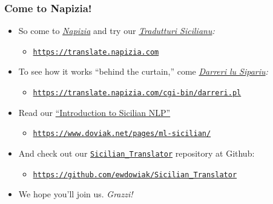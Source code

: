 \documentclass{beamer}
\begin{document}

\begin{frame}
  \frametitle{Come to Napizia!}
  \vspace{-1.0em}
  \begin{itemize}
  \item So come to \href{https://www.napizia.com/index.shtml}{\textit{Napizia}} and try our
    \href{https://translate.napizia.com}{\textit{Tradutturi Sicilianu}}\textit{:}
    \begin{itemize}
    \item \footnotesize{\href{https://translate.napizia.com}{\texttt{https://translate.napizia.com}}}
    \end{itemize}
    \vspace{0.65em}
  \item To see how it works ``behind the curtain,'' come
    \href{https://translate.napizia.com/cgi-bin/darreri.pl}{\textit{Darreri lu Sipariu}}\textit{:}
    \begin{itemize}
    \item \footnotesize{\href{https://translate.napizia.com/cgi-bin/darreri.pl}{\texttt{https://translate.napizia.com/cgi-bin/darreri.pl}}}
    \end{itemize}
    \vspace{0.65em}
  \item Read our \href{https://www.doviak.net/pages/ml-sicilian/}{``Introduction to Sicilian NLP''}
    \begin{itemize}
    \item \footnotesize{\href{https://www.doviak.net/pages/ml-sicilian/}{\texttt{https://www.doviak.net/pages/ml-sicilian/}}}
    \end{itemize}
    \vspace{0.65em}
  \item And check out our \href{https://github.com/ewdowiak/Sicilian_Translator}{\texttt{Sicilian\_Translator}} repository at Github:
    \begin{itemize}
    \item \footnotesize{\href{https://github.com/ewdowiak/Sicilian_Translator}{\texttt{https://github.com/ewdowiak/Sicilian\_Translator}}}
    \end{itemize}
    \vspace{0.65em}
  \item We hope you'll join us. \textit{Grazzi!}
  \end{itemize}
\end{frame}


\end{document}
